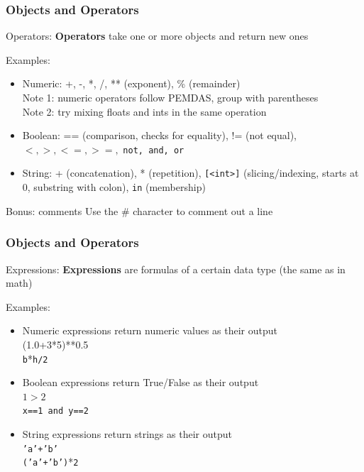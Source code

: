 \documentclass{beamer}
\newcommand{\code}[1]{\texttt{#1}}
\begin{document}
\begin{frame}%
	\frametitle{Objects and Operators}
	
	\begin{alertblock}{Operators:}
			\textbf{Operators} take one or more objects and return new ones
			
			\vspace{10pt}
			
			Examples:
			\begin{itemize}
				\item Numeric: +, -, *, /, ** (exponent), \% (remainder) \\
						Note 1: numeric operators follow PEMDAS, group with parentheses \\
						Note 2: try mixing floats and ints in the same operation
				\item Boolean: == (comparison, checks for equality), != (not equal), $<, >, <=, >=,$ \code{not, and, or}
				\item String: + (concatenation), * (repetition), \code{[<int>]} (slicing/indexing, starts at 0, substring with colon), \code{in} (membership)
			\end{itemize}			
	\end{alertblock}
	
	\begin{alertblock}{Bonus: comments}
			Use the \# character to comment out a line
	\end{alertblock}
	
\end{frame}

\begin{frame}%
	\frametitle{Objects and Operators}
	
	\begin{alertblock}{Expressions:}
			\textbf{Expressions} are formulas of a certain data type (the same as in math)
			
			\vspace{10pt}
			
			Examples:
			\begin{itemize}
				\item Numeric expressions return numeric values as their output \\
						(1.0+3*5)**0.5 \\
						\code{b}*\code{h/2}
				\item Boolean expressions return True/False as their output \\
						$1>2$ \\
						\code{x==1 and y==2}
				\item String expressions return strings as their output \\
						\code{'a'+'b'} \\
						\code{('a'+'b')}*\code{2}
			\end{itemize}			
	\end{alertblock}
	
\end{frame}
\end{document}
